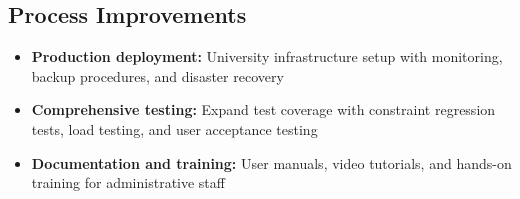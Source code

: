 \documentclass[12pt,a4paper]{report}
\begin{document}
\subsection{Process Improvements}

\begin{itemize}
    \item \textbf{Production deployment:} University infrastructure setup with monitoring, backup procedures, and disaster recovery
    
    \item \textbf{Comprehensive testing:} Expand test coverage with constraint regression tests, load testing, and user acceptance testing
    
    \item \textbf{Documentation and training:} User manuals, video tutorials, and hands-on training for administrative staff
\end{itemize}




\end{document}
